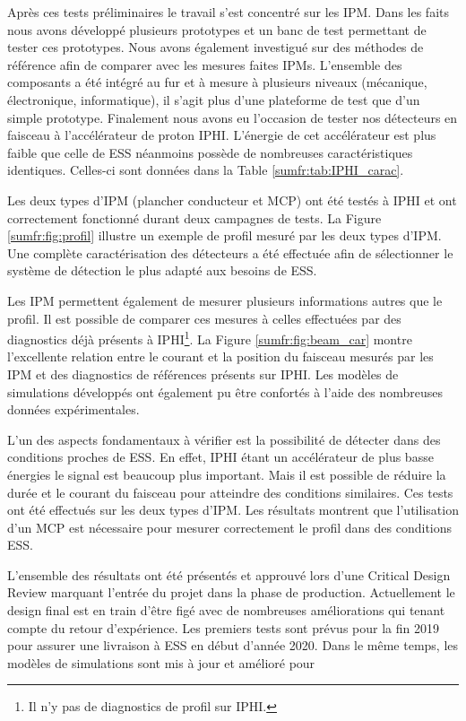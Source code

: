 
Après ces tests préliminaires le travail s'est concentré sur les IPM. Dans les faits nous avons développé plusieurs prototypes et un banc de test permettant de tester ces prototypes. Nous avons également investigué sur des méthodes de référence afin de comparer avec les mesures faites IPMs. L’ensemble des composants a été intégré au fur et à mesure à plusieurs niveaux (mécanique, électronique, informatique), il s’agit plus d’une plateforme de test que d’un simple prototype. Finalement nous avons eu l'occasion de tester nos détecteurs en faisceau à l'accélérateur de proton IPHI. L'énergie de cet accélérateur est plus faible que celle de ESS néanmoins possède de nombreuses caractéristiques identiques. Celles-ci sont données dans la Table \ref{sumfr:tab:IPHI_carac}.

Les deux types d’IPM (plancher conducteur et MCP) ont été testés à IPHI et ont correctement fonctionné durant deux campagnes de tests. La Figure \ref{sumfr:fig:profil} illustre un exemple de profil mesuré par les deux types d’IPM. Une complète caractérisation des détecteurs a été effectuée afin de sélectionner le système de détection le plus adapté aux besoins de ESS.


Les IPM permettent également de mesurer plusieurs informations autres que le profil. Il est possible de comparer ces mesures à celles effectuées par des diagnostics déjà présents à IPHI\footnote{Il n’y pas de diagnostics de profil sur IPHI.}. La Figure \ref{sumfr:fig:beam_car} montre l'excellente relation entre le courant et la position du faisceau mesurés par les IPM et des diagnostics de références présents sur IPHI. Les modèles de simulations développés ont également pu être confortés à l’aide des nombreuses données expérimentales.




L'un des aspects fondamentaux à vérifier est la possibilité de détecter dans des conditions proches de ESS. En effet, IPHI étant un accélérateur de plus basse énergies le signal est beaucoup plus important. Mais il est possible de réduire la durée et le courant du faisceau pour atteindre des conditions similaires. Ces tests ont été effectués sur les deux types d’IPM. Les résultats montrent que l’utilisation d’un MCP est nécessaire pour mesurer correctement le profil dans des conditions ESS. 

L’ensemble des résultats ont été présentés et approuvé lors d’une Critical Design Review marquant l’entrée du projet dans la phase de production. Actuellement le design final est en train d’être figé avec de nombreuses améliorations qui tenant compte du retour d’expérience. Les premiers tests sont prévus pour la fin 2019 pour assurer une livraison à ESS en début d’année 2020. Dans le même temps, les modèles de simulations sont mis à jour et amélioré pour 

